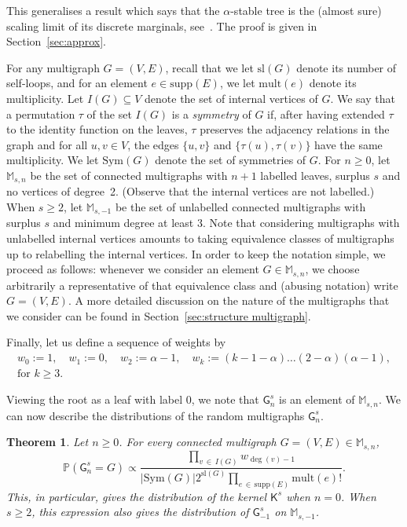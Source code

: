 \documentclass[10pt]{amsart}
\newtheorem{theo}{Theorem}[section]
\theoremstyle{definition}\newtheorem{defi}[theo]{Definition}\newtheorem{rema}[theo]{Remark}\newtheorem{exam}[theo]{Example}\newtheorem{exem}[theo]{Example}\newtheorem{nota}[theo]{Notation}
\newcommand{\abs}[1]{\left\lvert#1\right\rvert}
\newcommand{\Pp}[1]{\mathbb{P} \left(#1\right)}
\renewcommand{\subset}{\subseteq}
\newcommand{\supp}{\mathrm{supp}}
\newcommand{\sll}{\mathrm{sl}}
\newcommand{\Sym}{\mathrm{Sym}}
\newcommand{\mult}{\mathrm{mult}}
\newcommand{\sG}{\mathsf{G}}
\newcommand{\sK}{\mathsf{K}}
\newcommand{\M}{\mathbb{M}}
\begin{document}
This generalises a result which says that the $\alpha$-stable tree is the (almost sure) scaling limit of its discrete marginals, see~\cite{CurienHaas,Marchal}. The proof is given in Section~\ref{sec:approx}.

For any multigraph $G=(V,E)$, recall that we let $\sll(G)$ denote its number of self-loops, and for an element $e \in \supp(E)$, we let $\mult(e)$ denote its multiplicity. Let $I(G) \subset V$ denote the set of internal vertices of $G$. We say that a permutation $\tau$ of the set $I(G)$ is a \emph{symmetry} of $G$ if, after having extended $\tau$ to the identity function on the leaves, $\tau$ preserves the adjacency relations in the graph and for all $u,v \in V$, the edges $\{u,v\}$ and $\{\tau(u),\tau(v)\}$ have the same multiplicity. We let $\Sym(G)$ denote the set of symmetries of $G$. For $n \ge 0$, let $\M_{s,n}$ be the set of connected multigraphs with $n+1$ labelled leaves, surplus $s$ and no vertices of degree~2. (Observe that the internal vertices are not labelled.) When $s\geq 2$, let $\M_{s,-1}$ be the set of unlabelled connected multigraphs with surplus $s$ and minimum degree at least 3. Note that considering multigraphs with unlabelled internal vertices amounts to taking equivalence classes of multigraphs up to relabelling the internal vertices. In order to keep the notation simple, we proceed as follows: whenever we consider an element $G\in \M_{s,n}$, we choose arbitrarily a representative of that equivalence class and (abusing notation) write $G=(V,E)$. A more detailed discussion on the nature of the multigraphs that we consider can be found in Section~\ref{sec:structure multigraph}.

Finally, let us define a sequence of weights by
\begin{multline}\label{Marchal's weights}
w_0:=1, \quad w_1:=0, \quad w_2:=\alpha-1,\quad w_k:=(k-1-\alpha)\dots(2-\alpha)(\alpha-1), \\ \text{for }k\geq 3.
\end{multline}


Viewing the root as a leaf with label $0$, we note that $\sG_{n}^s$ is an element of $\M_{s,n}$. We can now describe the distributions of the random multigraphs $\sG_{n}^s$.

\begin{theo}\label{th:distr_marginals}
Let $n\geq0$. For every connected multigraph $G=(V,E) \in \M_{s,n}$,
\[
\Pp{\sG_{n}^s=G}\propto\frac{\prod\limits_{v\,\in\,I(G)} w_{\deg(v)-1}}{\abs{\Sym(G)}2^{\sll(G)}\prod\limits_{e\,\in\,\supp(E)}\mult(e)!}.
\]
This, in particular, gives the distribution of the kernel $\sK^s$ when $n=0$. When $s\geq 2$, this expression also gives the distribution of $\sG_{-1}^s$ on $\M_{s,-1}$.
\end{theo}
\end{document}
